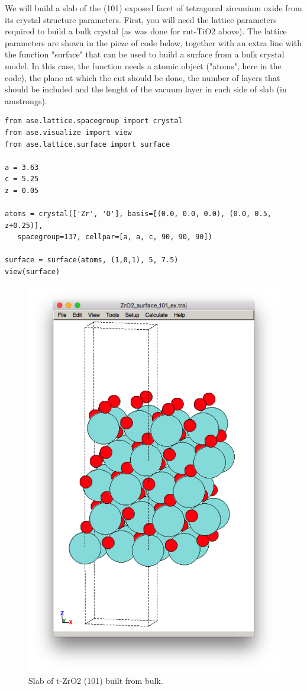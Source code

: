 \documentclass[11pt]{article}
\begin{document}
We will build a slab of the (101) exposed facet of tetragonal zirconium oxide from its crystal structure parameters. First, you will need the lattice parameters required to build a bulk crystal (as was done for rut-TiO2 above). The lattice parameters are shown in the pieze of code below, together with an extra line with the function "surface" that can be used to build a surface from a bulk crystal model. In this case, the function needs a atomic object ("atoms", here in the code), the plane at which the cut should be done, the number of layers that should be included and the lenght of the vacuum layer in each side of slab (in amstrongs). 

\begin{verbatim}
from ase.lattice.spacegroup import crystal
from ase.visualize import view
from ase.lattice.surface import surface

a = 3.63
c = 5.25
z = 0.05

atoms = crystal(['Zr', 'O'], basis=[(0.0, 0.0, 0.0), (0.0, 0.5, z+0.25)],
   spacegroup=137, cellpar=[a, a, c, 90, 90, 90])

surface = surface(atoms, (1,0,1), 5, 7.5)
view(surface)
\end{verbatim}

\begin{figure}[htbp]
\centering
\includegraphics[width=.9\linewidth]{./figures/ZrO2-surf-ex.png}
\caption{Slab of t-ZrO2 (101) built from bulk.}
\end{figure}
\end{document}
